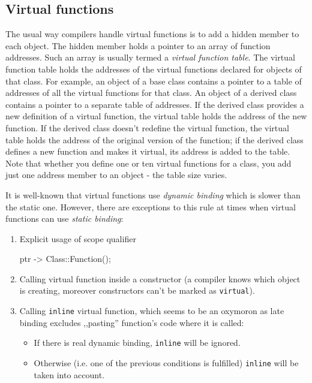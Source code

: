 \documentclass[../main]{subfiles}
\begin{document}
\subsection{Virtual functions}
    The usual way compilers handle virtual functions is to add a hidden member to each object. The hidden member holds a pointer to an array of function addresses. Such an array
is usually termed a \textit{virtual function table}. The virtual function table holds the addresses of the virtual functions declared for objects of that class. For example,
an object of a base class contains a pointer to a table of addresses of all the virtual functions for that class. An object of a derived class contains a pointer to a separate
table of addresses. If the derived class provides a new definition of a virtual function, the virtual table holds the address of the new function. If the derived class
doesn't redefine the virtual function, the virtual table holds the address of the original version of the function; if the derived class defines a new function and makes it virtual,
its address is added to the table. Note that whether you define one or ten virtual functions for a class, you add just one address member to an object - the table size varies.\newline

    It is well-known that virtual functions use \textit{dynamic binding} which is slower than the static one. However, there are exceptions to this rule at times when virtual
functions can use \textit{static binding}:
\begin{enumerate}
    \item Explicit usage of scope qualifier
    \begin{Code}
        ptr -> Class::Function();
    \end{Code}
    \item Calling virtual function inside a constructor (a compiler knows which object is creating, moreover constructors can't be marked as \texttt{virtual}).
    \item Calling \texttt{inline} virtual function, which seems to be an oxymoron as late binding excludes ,,pasting'' function's code where it is called:
    \begin{itemize}
        \item If there is real dynamic binding, \texttt{inline} will be ignored.
        \item Otherwise (i.e. one of the previous conditions is fulfilled) \texttt{inline} will be taken into account.
    \end{itemize}
\end{enumerate}
\end{document}
